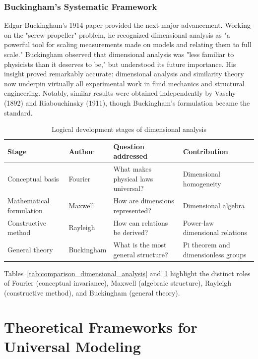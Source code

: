 \subsubsection*{Buckingham's Systematic Framework}

Edgar Buckingham's 1914 paper \cite{buckingham1914} provided the next major advancement. Working on the "screw propeller" problem, he recognized dimensional analysis as "a powerful tool for scaling measurements made on models and relating them to full scale." Buckingham observed that dimensional analysis was "less familiar to physicists than it deserves to be," but understood its future importance. His insight proved remarkably accurate: dimensional analysis and similarity theory now underpin virtually all experimental work in fluid mechanics and structural engineering. Notably, similar results were obtained independently by Vaschy (1892) and Riabouchinsky (1911), though Buckingham's formulation became the standard.

\begin{table}[h]
\centering
\small
\begin{tabular}{p{2.5cm} p{2.1cm} p{4.5cm} p{3.9cm}}
\hline
Stage & Author & Question addressed & Contribution \\
\hline
Conceptual basis & Fourier & What makes physical laws universal? & Dimensional homogeneity \\
Mathematical formulation & Maxwell & How are dimensions represented? & Dimensional algebra \\
Constructive method & Rayleigh & How can relations be derived? & Power-law dimensional relations \\
General theory & Buckingham & What is the most general structure? & Pi theorem and dimensionless groups \\
\hline
\end{tabular}
\caption{Logical development stages of dimensional analysis}
\label{tab:logical_progression_dimensional}
\end{table}

Tables~\ref{tab:comparison_dimensional_analysis} and~\ref{tab:logical_progression_dimensional} highlight the distinct roles of Fourier (conceptual invariance), Maxwell (algebraic structure), Rayleigh (constructive method), and Buckingham (general theory).

\section{Theoretical Frameworks for Universal Modeling}\label{ch02:TheoreticalFrameworks}

